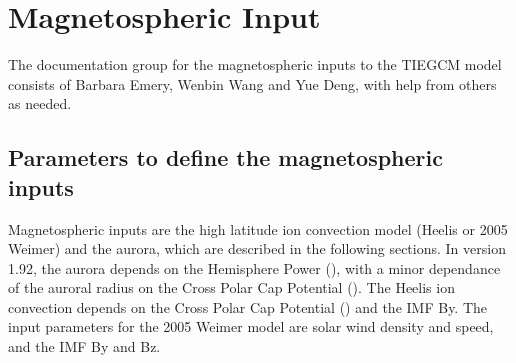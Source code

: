 %
\section{Magnetospheric Input} \label{cap:magneto_input}
%
The documentation group for the magnetospheric inputs to the TIEGCM model 
consists of Barbara Emery, Wenbin Wang and Yue Deng, with help from others 
as needed.
%
\subsection{Parameters to define the magnetospheric inputs}\label{cap:maginput}
% 
Magnetospheric inputs are the high latitude ion convection model (Heelis or
2005 Weimer) and the aurora, which are described in the following sections.
In version 1.92, the aurora depends on the Hemisphere Power (),
with a minor dependance of the auroral radius on the Cross Polar Cap
Potential ().  The Heelis ion convection \cite{heelis1982}
depends on the Cross Polar Cap Potential () and the IMF By.
The input parameters for the 2005 Weimer model \cite{weimer2005}
are solar wind density and speed, and the IMF By and Bz. \\


